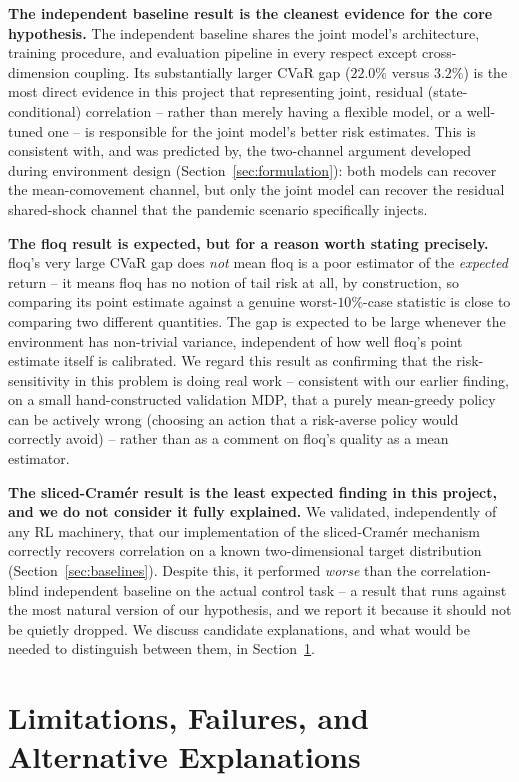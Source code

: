\documentclass[11pt]{article}
\begin{document}
\textbf{The independent baseline result is the cleanest evidence for the core hypothesis.} The independent baseline shares the joint model's architecture, training procedure, and evaluation pipeline in every respect except cross-dimension coupling. Its substantially larger CVaR gap ($22.0\%$ versus $3.2\%$) is the most direct evidence in this project that representing joint, residual (state-conditional) correlation -- rather than merely having a flexible model, or a well-tuned one -- is responsible for the joint model's better risk estimates. This is consistent with, and was predicted by, the two-channel argument developed during environment design (Section~\ref{sec:formulation}): both models can recover the mean-comovement channel, but only the joint model can recover the residual shared-shock channel that the pandemic scenario specifically injects.

\textbf{The floq result is expected, but for a reason worth stating precisely.} floq's very large CVaR gap does \emph{not} mean floq is a poor estimator of the \emph{expected} return -- it means floq has no notion of tail risk at all, by construction, so comparing its point estimate against a genuine worst-$10\%$-case statistic is close to comparing two different quantities. The gap is expected to be large whenever the environment has non-trivial variance, independent of how well floq's point estimate itself is calibrated. We regard this result as confirming that the risk-sensitivity in this problem is doing real work -- consistent with our earlier finding, on a small hand-constructed validation MDP, that a purely mean-greedy policy can be actively wrong (choosing an action that a risk-averse policy would correctly avoid) -- rather than as a comment on floq's quality as a mean estimator.

\textbf{The sliced-Cram\'er result is the least expected finding in this project, and we do not consider it fully explained.} We validated, independently of any RL machinery, that our implementation of the sliced-Cram\'er mechanism correctly recovers correlation on a known two-dimensional target distribution (Section~\ref{sec:baselines}). Despite this, it performed \emph{worse} than the correlation-blind independent baseline on the actual control task -- a result that runs against the most natural version of our hypothesis, and we report it because it should not be quietly dropped. We discuss candidate explanations, and what would be needed to distinguish between them, in Section~\ref{sec:limitations}.

\section{Limitations, Failures, and Alternative Explanations}
\label{sec:limitations}
\end{document}
